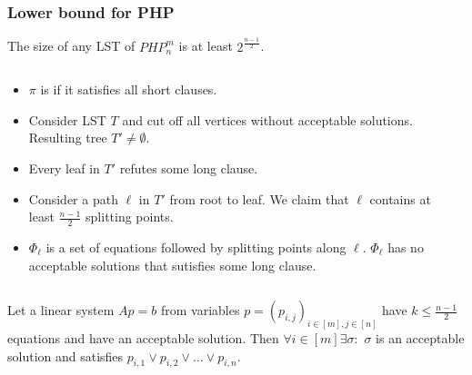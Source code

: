\begin{frame}
    \frametitle{Lower bound for PHP}

    \begin{theorem}
        The size of any LST of $PHP^m_n$ is at least $2^{\frac{n - 1}{2}}$.
    \end{theorem}


	\begin{columns}
		\begin{column}{8.5cm}
			\begin{itemize}
				\item $\pi$ is  if it satisfies all short
		            clauses.
               	\pause
				\item Consider LST $T$ and cut off all vertices without acceptable
	                solutions. Resulting tree $T'\neq \emptyset$.
                \pause
				\item Every leaf in $T'$ refutes some long clause.
           		\pause
				\item Consider a path $\ell$ in $T'$ from root to leaf. We claim
                	that $\ell$ contains at least $\frac{n - 1}{2}$ splitting
                    points.
                \pause
				\item $\Phi_\ell$ is a set of equations followed by splitting points
	                along $\ell$. $\Phi_\ell$ has no acceptable solutions that sutisfies
    	            some long clause. 
			\end{itemize}
		\end{column}
		\begin{column}{2cm}
		\end{column}
	\end{columns}
    
	\pause
    \begin{lemma}
        Let a linear system $Ap = b$ from variables $p =
        (p_{i, j})_{i \in [m], j \in [n]}$ have  $k \le \frac{n - 1}{2}$ equations
        and have an acceptable solution. Then  $\forall i \in [m] \exists \sigma:$
        $\sigma$ is an acceptable solution and satisfies $p_{i, 1} \lor p_{i, 2} \lor
        \dots \lor p_{i, n}$.
    \end{lemma}
\end{frame}


